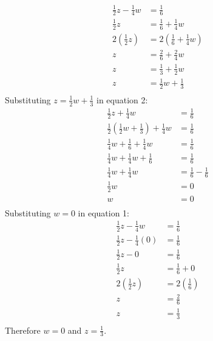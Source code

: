 \documentclass{article}
\begin{document}
\begin{description}
\begin{enumerate}
\begin{equation}
\begin{split}
                          \frac{1}{2}z - \frac{1}{4}w & = \frac{1}{6}\\
                          \frac{1}{2}z & = \frac{1}{6} + \frac{1}{4}w\\
                          2(\frac{1}{2}z) & = 2(\frac{1}{6} + \frac{1}{4}w)\\
                          z & = \frac{2}{6} + \frac{2}{4}w\\
                          z & = \frac{1}{3} + \frac{1}{2}w\\
                          z & =  \frac{1}{2}w + \frac{1}{3} \\
                      \end{split}
                  \end{equation}
                  Substituting $z  =  \frac{1}{2}w + \frac{1}{3}$ in equation 2:
                  \begin{equation}
                      \begin{split}
                          \frac{1}{2}z + \frac{1}{4}w & = \frac{1}{6}\\
                          \frac{1}{2}( \frac{1}{2}w + \frac{1}{3}) + \frac{1}{4}w & = \frac{1}{6}\\
                          \frac{1}{4}w + \frac{1}{6} + \frac{1}{4}w & = \frac{1}{6}\\
                          \frac{1}{4}w + \frac{1}{4}w + \frac{1}{6} & = \frac{1}{6} \\
                          \frac{1}{4}w + \frac{1}{4}w & = \frac{1}{6} - \frac{1}{6} \\
                          \frac{1}{2}w & = 0 \\
                          w & = 0 \\
                      \end{split}
                  \end{equation}
                  Substituting $w = 0$ in equation 1:
                  \begin{equation}
                      \begin{split}
                          \frac{1}{2}z - \frac{1}{4}w & = \frac{1}{6} \\
                          \frac{1}{2}z - \frac{1}{4}(0) & = \frac{1}{6} \\
                          \frac{1}{2}z - 0 & = \frac{1}{6} \\
                          \frac{1}{2}z  & = \frac{1}{6} + 0\\
                          2(\frac{1}{2}z)  & = 2(\frac{1}{6}) \\
                          z &= \frac{2}{6} \\
                          z &= \frac{1}{3} \\
                      \end{split}
                  \end{equation}
                  Therefore $w=0$ and $z=\frac{1}{3}$.
        \end{enumerate}
\end{description}
\end{document}
